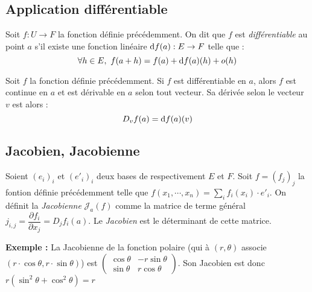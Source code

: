 \documentclass[11pt,a4paper,fleqn,pdftex]{report}
\begin{document}
\subsection{Application différentiable} %
\label{sub:application_differentiable}
\begin{dfn}
    Soit $f:U\to F$ la fonction définie précédemment.\newline
    On dit que $f$ est \emph{différentiable} au point $a$ s'il existe une fonction linéaire $\mathrm{d} f(a) : E \to F$ telle que :
    \begin{equation}
    \forall h \in E, \ f(a + h) = f(a) + \mathrm{d} f(a)(h) + o(h)
    \end{equation}
\end{dfn}
\begin{theorem}[$f$ dérivable en $a$]
     Soit $f$ la fonction définie précédemment. \newline
     Si $f$ est différentiable en $a$, alors $f$ est continue en $a$ et est dérivable en $a$ selon tout vecteur. Sa dérivée selon le vecteur $v$ est alors : 
     \begin{equation}
     D_v f(a) = \mathrm{d} f(a)(v)
     \end{equation}
\end{theorem}
\subsection{Jacobien, Jacobienne} %
\label{sub:jacobien_jacobienne}
\begin{dfn}
  Soient $(e_i)_i$ et $(e'_i)_i$ deux bases de respectivement $E$ et $F$.\newline
  Soit $f=(f_j)_j$ la fontion définie précédemment telle que $f(x_1,\cdots,x_n) = \sum_i f_i (x_i)\cdot e'_i$. 
On définit la \emph{Jacobienne} $\mathcal{J}_a(f)$ comme la matrice de terme général $j_{i,j}=\dfrac{\partial f_i}{\partial x_j}=D_jf_i(a)$. \newline
Le \emph{Jacobien} est le déterminant de cette matrice.
\end{dfn}

\textbf{Exemple :} La Jacobienne de la fonction polaire (qui à $(r,\theta )$ associe $(r\cdot \cos{\theta} , r\cdot \sin{\theta} )$) est $\begin{pmatrix}
\cos{\theta} & -r\sin{\theta} \\
\sin{\theta} & r\cos{\theta}
\end{pmatrix}$. Son Jacobien est donc $r\left( \sin^2{\theta} + \cos^2{\theta} \right)=r$
\end{document}
